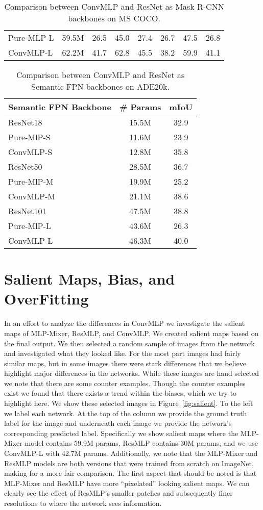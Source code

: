 \documentclass[final]{cvpr}
\begin{document}
\begin{table*}[!ht]
\begin{tabular}{l|c|ccc|ccc}
Pure-MLP-L & 59.5M  & 26.5 & 45.0 &27.4 & 26.7 & 47.5 & 26.8 \\
ConvMLP-L & 62.2M & 41.7 & 62.8 & 45.5 & 38.2 & 59.9 & 41.1 \\
\bottomrule[2pt]
\end{tabular} 
\caption{Comparison between ConvMLP and ResNet as Mask R-CNN backbones on MS COCO.}
\label{tab:maskrcnn}
\end{table*} \begin{table*}[!ht]
\centering
\begin{tabular}{l|c|c}
\toprule[2pt]
Semantic FPN Backbone & \# Params & mIoU \\ 
\midrule[1.5pt]
ResNet18~\cite{he2016deep} & 15.5M & 32.9 \\
Pure-MlP-S & 11.6M & 23.9 \\
ConvMLP-S & 12.8M & 35.8 \\
\midrule
ResNet50~\cite{he2016deep} & 28.5M & 36.7 \\
Pure-MlP-M & 19.9M & 25.2 \\
ConvMLP-M & 21.1M & 38.6  \\
\midrule
ResNet101~\cite{he2016deep} & 47.5M & 38.8 \\
Pure-MlP-L & 43.6M & 26.3 \\
ConvMLP-L & 46.3M & 40.0 \\
\bottomrule[2pt]
\end{tabular} 
\caption{Comparison between ConvMLP and ResNet as Semantic FPN backbones on ADE20k.}
\label{tab:semseg}
\end{table*} 
\section{Salient Maps, Bias, and OverFitting}
In an effort to analyze the differences in ConvMLP we investigate the salient maps of MLP-Mixer, ResMLP, and ConvMLP. 
We created salient maps based on the final output. We then selected a random sample of images from the network and investigated what they looked like.
For the most part images had fairly similar maps, but in some images there were stark differences that we believe highlight major differences in the networks. 
While these images are hand selected we note that there are some counter examples.
Though the counter examples exist we found that there exists a trend within the biases, which we try to highlight here.
We show these selected images in Figure~\ref{fig:salient}. 
To the left we label each network. 
At the top of the column we provide the ground truth label for the image and underneath each image we provide the network's corresponding predicted label.
Specifically we show salient maps where the MLP-Mixer model contains 59.9M params, ResMLP contains 30M params, and we use ConvMLP-L with 42.7M params. 
Additionally, we note that the MLP-Mixer and ResMLP models are both versions that were trained from scratch on ImageNet, making for a more fair comparison. 
The first aspect that should be noted is that MLP-Mixer and ResMLP have more ``pixelated'' looking salient maps.
We can clearly see the effect of ResMLP's smaller patches and subsequently finer resolutions to where the network sees information.
\end{document}
